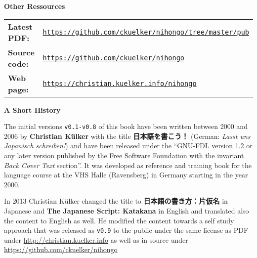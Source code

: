 \begingroup
\vspace*{100pt}

\begin{flushleft}
\fontsize{12pt}{12pt}\selectfont\sffamily
\textbf{Other Ressources}
\vspace*{18pt}

\fontsize{12pt}{12pt}\selectfont\sffamily
\begin{tabular}{ l l }
\textbf{\sffamily Latest PDF:} &\texttt{\href{https://github.com/ckuelker/nihongo/tree/master/pub/}{https://github.com/ckuelker/nihongo/tree/master/pub}}\\
\textbf{\sffamily Source code:} &\texttt{\href{https://github.com/ckuelker/nihongo/}{https://github.com/ckuelker/nihongo}}\\
\textbf{\sffamily Web page:} &\texttt{\href{https://christian.kuelker.info/nihongo/}{https://christian.kuelker.info/nihongo}}\\
\end{tabular}

\vspace*{24pt}
\fontsize{12pt}{12pt}\selectfont\sffamily
\textbf{A Short History}\\
\vspace*{18pt}

\newcommand{\jfontsizenine}{\fontsize{9pt}{9pt}\selectfont\sffamily}

{
\fontsize{9pt}{9pt}\selectfont\sffamily
The initial versions \texttt{v0.1-v0.8} of this book have been written between
2000 and ⁠2006 by \textbf{Christian Külker} with the title
\textbf{日本語を書こう！} (German: \textit{Lasst uns Japanisch schreiben!}) and
have been released under the “GNU-FDL version 1.2 or any later version
published by the Free Software Foundation with the invariant \textit{Back Cover
Text} section”.  It was developed as reference and training book for the
language course at the VHS Halle (Ravensberg) in Germany starting in the year
2000.\medskip

In 2013 Christian Külker changed the title to \textbf{日本語の書き方：片仮名}
in Japanese and \textbf{The Japanese Script: Katakana} in English and
translated also the content to English as well. He modified the content towards
a self study approach that was released as \texttt{v0.9} to the public under
the same license as PDF under \url{http://christian.kuelker.info} as well as in
source under \url{https://github.com/ckuelker/nihongo}\medskip

}
\end{flushleft}
